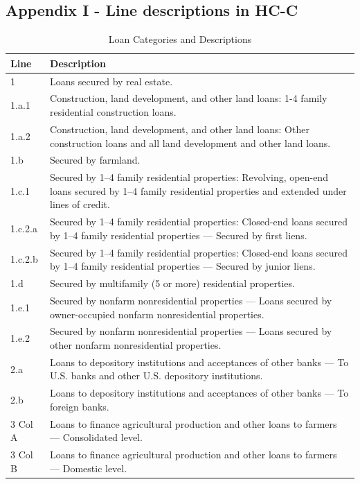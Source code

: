 \documentclass[conference]{IEEEtran}
\begin{document}
\subsection{Appendix I - Line descriptions in HC-C}
\begin{table}[htbp]
	\centering
	\caption{Loan Categories and Descriptions}
	\begin{tabular}{|p{3cm}|p{12cm}|}
		\hline
		\textbf{Line} & \textbf{Description} \\
		\hline
		1 & Loans secured by real estate. \\
		\hline
		1.a.1 & Construction, land development, and other land loans: 1-4 family residential construction loans. \\
		\hline
		1.a.2 & Construction, land development, and other land loans: Other construction loans and all land development and other land loans. \\
		\hline
		1.b & Secured by farmland. \\
		\hline
		1.c.1 & Secured by 1–4 family residential properties: Revolving, open-end loans secured by 1–4 family residential properties and extended under lines of credit. \\
		\hline
		1.c.2.a & Secured by 1–4 family residential properties: Closed-end loans secured by 1–4 family residential properties — Secured by first liens. \\
		\hline
		1.c.2.b & Secured by 1–4 family residential properties: Closed-end loans secured by 1–4 family residential properties — Secured by junior liens. \\
		\hline
		1.d & Secured by multifamily (5 or more) residential properties. \\
		\hline
		1.e.1 & Secured by nonfarm nonresidential properties — Loans secured by owner-occupied nonfarm nonresidential properties. \\
		\hline
		1.e.2 & Secured by nonfarm nonresidential properties — Loans secured by other nonfarm nonresidential properties. \\
		\hline
		2.a & Loans to depository institutions and acceptances of other banks — To U.S. banks and other U.S. depository institutions. \\
		\hline
		2.b & Loans to depository institutions and acceptances of other banks — To foreign banks. \\
		\hline
		3 Col A & Loans to finance agricultural production and other loans to farmers — Consolidated level. \\
		\hline
		3 Col B & Loans to finance agricultural production and other loans to farmers — Domestic level. \\

\end{tabular}
\end{table}
\end{document}
